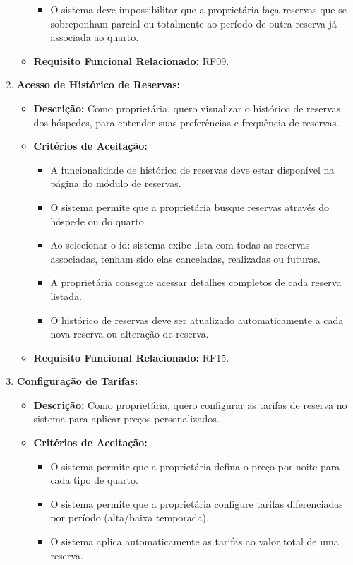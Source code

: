 \documentclass[
	12pt,				%
	openany,			%
	oneside,			%
	a4paper,			%
	english,			%
	french,				%
	spanish,			%
	brazil				%
	]{abntex2}
\begin{document}
\begin{enumerate}[label=\textbf{\arabic*.}]
\begin{itemize}
\begin{itemize}
			\item O sistema deve impossibilitar que a proprietária faça reservas que se sobreponham parcial ou totalmente ao período de outra reserva já associada ao quarto.
		\end{itemize}
		\item \textbf{Requisito Funcional Relacionado:} RF09.
	\end{itemize} 
	\item \textbf{Acesso de Histórico de Reservas:}
	\begin{itemize}
		\item \textbf{Descrição:} Como proprietária, quero visualizar o histórico de reservas dos hóspedes, para entender suas preferências e frequência de reservas.
		\item \textbf{Critérios de Aceitação:}
		\begin{itemize}
			\item A funcionalidade de histórico de reservas  deve estar disponível na página do módulo de reservas.
			\item O sistema permite que a proprietária busque reservas através do hóspede ou do quarto.
			\item Ao selecionar o id: sistema exibe lista com todas as reservas associadas, tenham sido elas canceladas, realizadas ou futuras.
			\item A proprietária consegue acessar detalhes completos de cada reserva listada.
			\item O histórico de reservas deve ser atualizado automaticamente a cada nova reserva ou alteração de reserva.
		\end{itemize}
		\item \textbf{Requisito Funcional Relacionado:} RF15.
	\end{itemize} 
	\item \textbf{Configuração de Tarifas:}
	\begin{itemize}
		\item \textbf{Descrição:} Como proprietária, quero configurar as tarifas de reserva no sistema para aplicar preços personalizados.
		\item \textbf{Critérios de Aceitação:}
		\begin{itemize}
			\item O sistema permite que a proprietária defina o preço por noite para cada tipo de quarto.
			\item O sistema permite que a proprietária configure tarifas diferenciadas por período (alta/baixa temporada).
			\item O sistema aplica automaticamente as tarifas ao valor total de uma reserva.

\end{itemize}
\end{itemize}
\end{enumerate}
\end{document}
